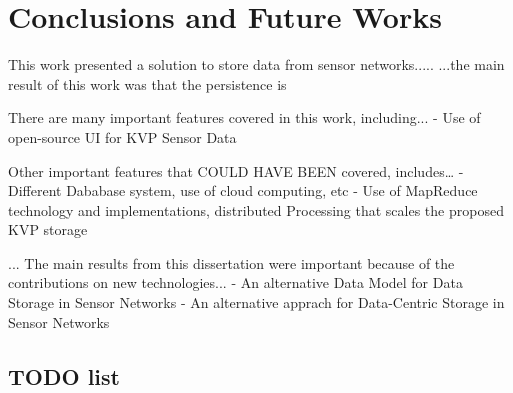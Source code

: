

\chapter{Conclusions and Future Works}

This work presented a solution to store data from sensor networks.....
...the main result of this work was that the persistence is

There are many important features covered in this work, including...
  - Use of open-source UI for KVP Sensor Data

Other important features that COULD HAVE BEEN covered, includes\ldots
  - Different Dababase system, use of cloud computing, etc
  - Use of MapReduce technology and implementations, distributed Processing that scales the proposed KVP storage

... The main results from this dissertation were important because of the contributions on new technologies...
  - An alternative Data Model for Data Storage in Sensor Networks
  - An alternative apprach for Data-Centric Storage in Sensor Networks

\section{TODO list}
